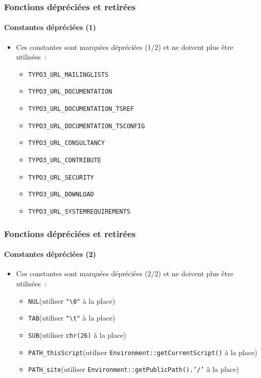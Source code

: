 \begin{frame}[fragile]
	\frametitle{Fonctions dépréciées et retirées}
	\framesubtitle{Constantes dépréciées (1)}

	\begin{itemize}
		\item Ces constantes sont marquées dépréciées (1/2)\newline
			et ne doivent plus être utilisées~:

			\begin{itemize}\smaller
				\item \texttt{TYPO3\_URL\_MAILINGLISTS}
				\item \texttt{TYPO3\_URL\_DOCUMENTATION}
				\item \texttt{TYPO3\_URL\_DOCUMENTATION\_TSREF}
				\item \texttt{TYPO3\_URL\_DOCUMENTATION\_TSCONFIG}
				\item \texttt{TYPO3\_URL\_CONSULTANCY}
				\item \texttt{TYPO3\_URL\_CONTRIBUTE}
				\item \texttt{TYPO3\_URL\_SECURITY}
				\item \texttt{TYPO3\_URL\_DOWNLOAD}
				\item \texttt{TYPO3\_URL\_SYSTEMREQUIREMENTS}
			\end{itemize}

	\end{itemize}

\end{frame}


\begin{frame}[fragile]
	\frametitle{Fonctions dépréciées et retirées}
	\framesubtitle{Constantes dépréciées (2)}

	\begin{itemize}
		\item Ces constantes sont marquées dépréciées (2/2)\newline
			et ne doivent plus être utilisées~:

			\begin{itemize}\smaller
				\item \texttt{NUL}\tabto{3cm}(utiliser \texttt{"\textbackslash 0"} à la place)
				\item \texttt{TAB}\tabto{3cm}(utiliser \texttt{"\textbackslash t"} à la place)
				\item \texttt{SUB}\tabto{3cm}(utiliser \texttt{chr(26)} à la place)
				\item \texttt{PATH\_thisScript}\tabto{3cm}(utiliser \texttt{Environment::getCurrentScript()} à la place)
				\item \texttt{PATH\_site}\tabto{3cm}(utiliser \texttt{Environment::getPublicPath().'/'} à la place)
			\end{itemize}
	\end{itemize}

\end{frame}

